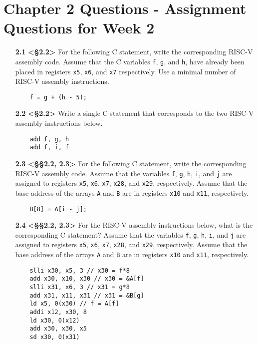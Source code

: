 \documentclass[11pt]{article}
\begin{document}
\section*{Chapter 2 Questions - Assignment Questions for Week 2}

\begin{enumerate}
    \item[\textbf{2.1}] \textbf{<§2.2>} For the following C statement, write the corresponding RISC-V 
    assembly code. Assume that the C variables \texttt{f}, \texttt{g}, and \texttt{h}, have already been placed in registers \texttt{x5}, \texttt{x6}, and \texttt{x7} respectively. Use a minimal number of RISC-V assembly 
    instructions.
    \begin{verbatim}
    f = g + (h - 5);
    \end{verbatim}

    \item[\textbf{2.2}] \textbf{<§2.2>} Write a single C statement that corresponds to the two RISC-V 
    assembly instructions below.
    \begin{verbatim}
    add f, g, h
    add f, i, f
    \end{verbatim}

    \item[\textbf{2.3}] \textbf{<§§2.2, 2.3>} For the following C statement, write the corresponding 
    RISC-V assembly code. Assume that the variables \texttt{f}, \texttt{g}, \texttt{h}, \texttt{i}, and \texttt{j} are assigned to registers \texttt{x5}, \texttt{x6}, \texttt{x7}, \texttt{x28}, and \texttt{x29}, respectively. Assume that the base address of the arrays \texttt{A} and \texttt{B} are in registers \texttt{x10} and \texttt{x11}, respectively.
    \begin{verbatim}
    B[8] = A[i - j];
    \end{verbatim}

    \item[\textbf{2.4}] \textbf{<§§2.2, 2.3>} For the RISC-V assembly instructions below, what is the 
    corresponding C statement? Assume that the variables \texttt{f}, \texttt{g}, \texttt{h}, \texttt{i}, and \texttt{j} are assigned to registers \texttt{x5}, \texttt{x6}, \texttt{x7}, \texttt{x28}, and \texttt{x29}, respectively. Assume that the base address of the arrays \texttt{A} and \texttt{B} are in registers \texttt{x10} and \texttt{x11}, respectively.
    \begin{verbatim}
    slli x30, x5, 3 // x30 = f*8
    add x30, x10, x30 // x30 = &A[f]
    slli x31, x6, 3 // x31 = g*8
    add x31, x11, x31 // x31 = &B[g]
    ld x5, 0(x30) // f = A[f]
    addi x12, x30, 8
    ld x30, 0(x12)
    add x30, x30, x5
    sd x30, 0(x31)
    \end{verbatim}


\end{enumerate}
\end{document}
